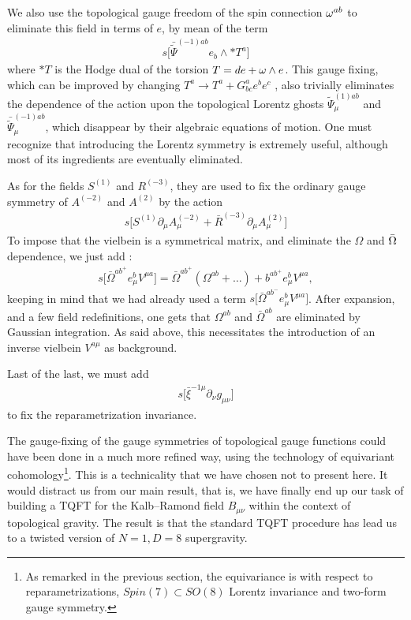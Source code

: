 \documentclass[a4paper,12pt]{article}
\begin{document}
We also  use the topological gauge freedom 
of the spin connection
$\omega^{ab }$ to eliminate  this field  
in terms of $e$, by mean of the term 
\begin{eqnarray}
s\Big [ \bar {\tilde \Psi}^{(-1)ab} e_b \wedge * T^a \Big]
\end{eqnarray}  
where $*T$ is the Hodge dual of the torsion $T=de+\omega\wedge e $.
This gauge fixing, which
can be improved by changing $ T^a\to T^a +G^a_{bc} e^be^c$ , also
trivially  eliminates  the dependence of the action upon the topological
Lorentz ghosts
 $ {\tilde \Psi}^{(1) ab}_\mu$ and  $\bar {\tilde \Psi}^{(-1)ab}_\mu$,
which disappear by their algebraic equations of motion.
One must recognize that introducing the Lorentz symmetry is extremely
useful, although most of its ingredients are eventually
eliminated.

As for the fields $   S^{(1)}$ and $R^{(-3)}$, they are used to
fix the ordinary gauge symmetry of 
$A^{(-2)}$ and $A^{(2)}$ by the action
\begin{eqnarray}
s\Big [   S^{ (1)}  \partial_\mu A^{(-2)}_\mu  +\bar R^{(-3)}\partial_\mu
A^{(2)}_\mu  \Big ]
\end{eqnarray}
To impose that the vielbein is a symmetrical matrix, and eliminate the 
$\Omega$ and $\bar {\Omega}$ dependence, we just add :
\begin{eqnarray}
s \Big[   \bar \Omega  ^{ab^+}   e^{b}_\mu V ^{\mu a} \Big]
=\bar \Omega  ^{ab^+}   (\Omega  ^{ab}  +\ldots)
+b  ^{ab^+}  
e^{b}_\mu V ^{\mu a},
\end{eqnarray}
keeping in mind that we had already used a term
$s \Big[   \bar \Omega  ^{ab^-}   e^{b}_\mu V ^{\mu a} \Big]$.  After
expansion, and a few field redefinitions, one gets that
$ \Omega ^{ab}$ and $ \bar \Omega ^{ab}$  are  eliminated by Gaussian
integration.  As said above, this necessitates the introduction of an 
inverse vielbein $V^{a\mu}$ as background.

Last of the last, we must add
\begin{eqnarray}
s\Big [\bar\xi ^{-1\mu }\partial_\nu g_{\mu\nu}  \Big ]
\end{eqnarray}
to fix the reparametrization invariance.

The gauge-fixing of the  gauge symmetries of  
topological gauge functions could have been done in a much more refined
way, using the technology of equivariant cohomology\footnote {As
remarked in the previous section, the
equivariance is with respect to reparametrizations, $Spin(7)\subset
SO(8)$ Lorentz invariance and two-form gauge symmetry.}.
This is a technicality that we have chosen not
to present here. It would     distract us from our main result,  
that is, we have finally end up our task of building a TQFT for the
Kalb--Ramond field
$B_{\mu\nu}$  within the context of
topological gravity. The result is that the standard TQFT
procedure has lead us to a twisted version of $N=1, D=
8$ supergravity.
\end{document}
